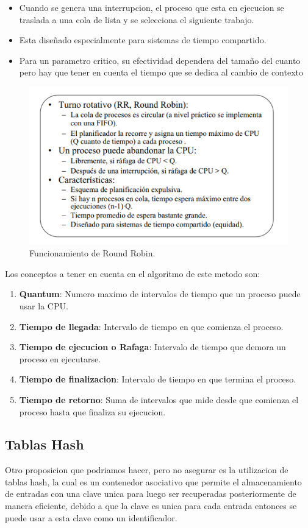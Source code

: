 \documentclass[conference,letterpaper]{IEEEtran}
\begin{document}
\begin{itemize}
    \item Cuando se genera una interrupcion, el proceso que esta en ejecucion se traslada a una cola de lista y se selecciona el siguiente trabajo.
    \item Esta diseñado especialmente para sistemas de tiempo compartido.
    \item Para un parametro critico, su efectividad dependera del tamaño del cuanto pero hay que tener en cuenta el tiempo que se dedica al cambio de contexto
\end{itemize}

\begin{figure}[thpb]
      \centering
      \includegraphics[width=0.6\linewidth]{rr.png}
      \caption{Funcionamiento de Round Robin.}
      \label{fig:RR}
\end{figure}

Los conceptos a tener en cuenta en el algoritmo de este metodo son:
\begin{enumerate}
    \item \textbf{Quantum}: Numero maximo de intervalos de tiempo que un proceso puede usar la CPU.
    \item \textbf{Tiempo de llegada}: Intervalo de tiempo en que comienza el proceso.
    \item \textbf{Tiempo de ejecucion o Rafaga}: Intervalo de tiempo que demora un proceso en ejecutarse.
    \item \textbf{Tiempo de finalizacion}: Intervalo de tiempo en que termina el proceso.
    \item \textbf{Tiempo de retorno}: Suma de intervalos que mide desde que comienza el proceso hasta que finaliza su ejecucion.
\end{enumerate}

\subsection{Tablas Hash}
Otro proposicion que podriamos hacer, pero no asegurar es la utilizacion de tablas hash, la cual es un contenedor asociativo que permite el almacenamiento de entradas con una clave unica para luego ser recuperadas posteriormente de manera eficiente, debido a que la clave es unica para cada entrada entonces se puede usar a esta clave como un identificador.
\end{document}

